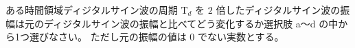 ある時間領域ディジタルサイン波の周期 $\textrm{T}_d$ を $2$ 倍したディジタルサイン波の振幅は元のディジタルサイン波の振幅と比べてどう変化するか選択肢 a〜d の中から1つ選びなさい。
ただし元の振幅の値は $0$ でない実数とする。
